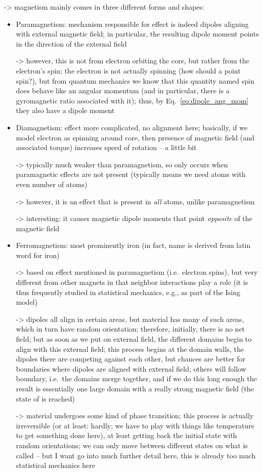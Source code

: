 \documentclass[../class_mech_main.tex]{subfiles}
\begin{document}
-> magnetism mainly comes in three different forms and shapes:
\begin{itemize}
    \item Paramagnetism: mechanism responsible for effect is indeed dipoles aligning with external magnetic field; in particular, the resulting dipole moment points in the direction of the external field
    
    -> however, this is not from electron orbiting the core, but rather from the electron's spin; the electron is not actually spinning (how should a point spin?), but from quantum mechanics we know that this quantity named spin does behave like an angular momentum (and in particular, there is a gyromagnetic ratio associated with it); thus, by Eq.~\eqref{eq:dipole_ang_mom} they also have a dipole moment
    

    \item Diamagnetism: effect more complicated, no alignment here; basically, if we model electron as spinning around core, then presence of magnetic field (and associated torque) increases speed of rotation -- a little bit
    
    -> typically much weaker than paramagnetism, so only occurs when paramagnetic effects are not present (typically means we need atoms with even number of atoms)

    -> however, it is an effect that is present in \emph{all} atoms, unlike paramagnetism

    -> interesting: it causes magnetic dipole moments that point \emph{opposite} of the magnetic field
    

    \item Ferromagnetism: most prominently iron (in fact, name is derived from latin word for iron)
    
    -> based on effect mentioned in paramagnetism (i.e.~electron spins), but very different from other magnets in that neighbor interactions play a role (it is thus frequently studied in statistical mechanics, e.g., as part of the Ising model)
    
    -> dipoles all align in certain areas, but material has many of such areas, which in turn have random orientation; therefore, initially, there is no net field; but as soon as we put on external field, the different domains begin to align with this external field; this process begins at the domain walls, the dipoles there are competing against each other, but chances are better for boundaries where dipoles are aligned with external field; others will follow boundary, i.e.~the domains merge together, and if we do this long enough the result is essentially one large domain with a really strong magnetic field (the state of  is reached)

    -> material undergoes some kind of phase transition; this process is actually irreversible (or at least: hardly; we have to play with things like temperature to get something done here), at least getting back the initial state with random orientations; we can only move between different states on what is called  -- but I want go into much further detail here, this is already too much statistical mechanics here
\end{itemize}
\end{document}
